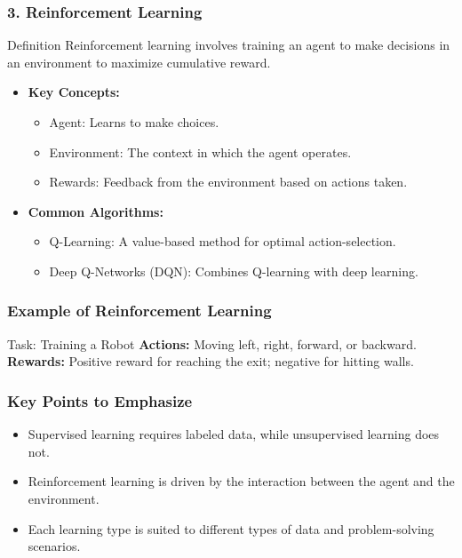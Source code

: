 \documentclass[aspectratio=169]{beamer}
\begin{document}
\begin{frame}[fragile]
    \frametitle{3. Reinforcement Learning}
    \begin{block}{Definition}
        Reinforcement learning involves training an agent to make decisions in an environment to maximize cumulative reward.
    \end{block}

    \begin{itemize}
        \item \textbf{Key Concepts:}
        \begin{itemize}
            \item Agent: Learns to make choices.
            \item Environment: The context in which the agent operates.
            \item Rewards: Feedback from the environment based on actions taken.
        \end{itemize}

        \item \textbf{Common Algorithms:}
        \begin{itemize}
            \item Q-Learning: A value-based method for optimal action-selection.
            \item Deep Q-Networks (DQN): Combines Q-learning with deep learning.
        \end{itemize}
    \end{itemize}
\end{frame}

\begin{frame}[fragile]
    \frametitle{Example of Reinforcement Learning}
    \begin{block}{Task: Training a Robot}
        \textbf{Actions:} Moving left, right, forward, or backward.\\
        \textbf{Rewards:} Positive reward for reaching the exit; negative for hitting walls.
    \end{block}
\end{frame}

\begin{frame}[fragile]
    \frametitle{Key Points to Emphasize}
    \begin{itemize}
        \item Supervised learning requires labeled data, while unsupervised learning does not.
        \item Reinforcement learning is driven by the interaction between the agent and the environment.
        \item Each learning type is suited to different types of data and problem-solving scenarios.
    \end{itemize}
\end{frame}
\end{document}
